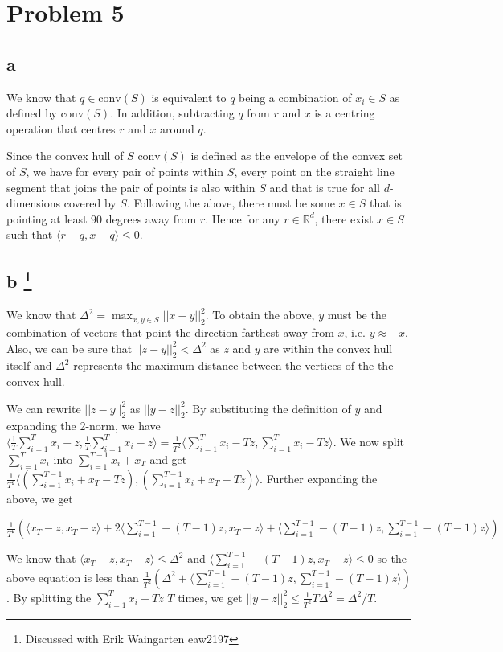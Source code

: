 \documentclass[twoside]{homework}
\begin{document}
\newpage
\section*{Problem 5}
\subsection*{a}
We know that $q \in \textrm{conv}(S)$ is equivalent to $q$ being a combination of $x_i \in S$ as defined by $\textrm{conv}(S)$. In addition, subtracting $q$ from $r$ and $x$ is a centring operation that centres $r$ and $x$ around $q$.

Since the convex hull of $S$ $\textrm{conv}(S)$ is defined as the envelope of the convex set of $S$, we have for every pair of points within $S$, every point on the straight line segment that joins the pair of points is also within $S$ and that is true for all $d$-dimensions covered by $S$. Following the above, there must be some $x \in S$ that is pointing at least 90 degrees away from $r$. Hence for any $r \in  \mathbb{R}^d$, there exist $x \in S$ such that $\langle r - q, x - q \rangle \le 0.$

\subsection*{b \footnote{Discussed with Erik Waingarten eaw2197}}
We know that $\Delta^2 = \max_{x,y \in S} ||x - y||_{2}^{2}$. To obtain the above, $y$ must be the combination of vectors that point the direction farthest away from $x$, i.e. $y \approx - x$. Also, we can be sure that $||z - y||_{2}^{2} < \Delta^2$ as $z$ and $y$ are within the convex hull itself and $\Delta^2$ represents the maximum distance between the vertices of the  the convex hull.

We can rewrite $||z - y||_{2}^{2}$ as $||y - z||_{2}^{2}$. By substituting the definition of $y$ and expanding the 2-norm, we have $\langle \frac{1}{T} \sum_{i=1}^{T} x_i - z, \frac{1}{T} \sum_{i=1}^{T} x_i - z \rangle = \frac{1}{T^2}\langle \sum_{i=1}^{T} x_i - Tz, \sum_{i=1}^{T} x_i - Tz \rangle$. We now split $\sum_{i=1}^{T} x_i$ into $\sum_{i=1}^{T-1} x_i + x_T$ and get $\frac{1}{T^2} \langle (\sum_{i=1}^{T-1} x_i + x_T - Tz), (\sum_{i=1}^{T-1} x_i + x_T - Tz) \rangle$. Further expanding the above, we get

$\frac{1}{T^2}(\langle x_T - z, x_T - z \rangle + 2\langle \sum_{i=1}^{T-1} - (T-1)z, x_T - z \rangle + \langle \sum_{i=1}^{T-1} - (T-1)z, \sum_{i=1}^{T-1} - (T-1)z \rangle)$   

We know that $\langle x_T - z, x_T - z \rangle \le \Delta^2$ and $\langle \sum_{i=1}^{T-1} - (T-1)z, x_T - z \rangle \le 0$ so the above equation is less than $\frac{1}{T^2}(\Delta^2 + \langle \sum_{i=1}^{T-1} - (T-1)z, \sum_{i=1}^{T-1} - (T-1)z \rangle)$. By splitting the $\sum_{i=1}^{T} x_i - Tz$ $T$ times, we get $||y - z||_{2}^{2} \le \frac{1}{T^2} T \Delta^2 = \Delta^2 / T$.
\end{document}
